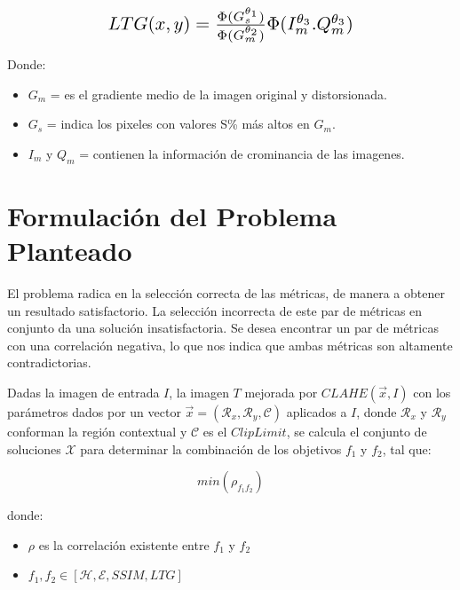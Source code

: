 \documentclass[spanish,twocolumn]{article}
\begin{document}
\begin{equation}\label{eq:ltg}
\resizebox{.6\hsize}{!}
{
$LTG(x,y) =\frac{\Phi(G_{s}^{\theta_1})}{\Phi(G_{m}^{\theta_2})} \Phi(I_{m}^{\theta_3}.Q_{m}^{\theta_3})$
}
\end{equation}

Donde:
\begin{itemize}
 \item $G_{m}$ =  es el gradiente medio de la imagen original y distorsionada.
 \item $ G_{s}$ = indica los pixeles con valores S\% más altos en $G_{m}$.
 \item  $I_{m}$ y $Q_{m}$ = contienen la información de crominancia de las imagenes. 
\end{itemize} 

\section{Formulación del Problema Planteado}
\label{sec:formulacion}
El problema radica en la selección correcta de las métricas, de manera a obtener un resultado satisfactorio. La selección incorrecta de este par de métricas en conjunto da una solución insatisfactoria. Se desea encontrar un par de métricas con una correlación negativa, lo que nos indica que ambas métricas son altamente contradictorias.

Dadas la imagen de entrada $I$, la imagen $T$ mejorada por $CLAHE(\overrightarrow{x},I)$ con los parámetros dados por un vector $\overrightarrow{x}=(\mathcal{R}_x, \mathcal{R}_y, \mathcal{C})$ aplicados a $I$, donde $\mathcal{R}_x$ y $\mathcal{R}_y$ conforman la región contextual y $\mathscr{C}$ es el $Clip Limit$, se calcula el conjunto de soluciones $\mathscr{X}$ para determinar la combinación de los objetivos $f_1$ y $f_2$, tal que:

\begin{equation}\label{eq:fitness}
 min (\rho_{{f_1}{f_2}})  
\end{equation}

donde:
\begin{itemize}
\item $\rho $ es la correlación existente entre ${f_1}$ y ${f_2}$

\item $ f_1,f_2 \in [\mathcal{H}, \mathcal{E}, {SSIM}, {LTG}]$
\end{itemize}
\end{document}
